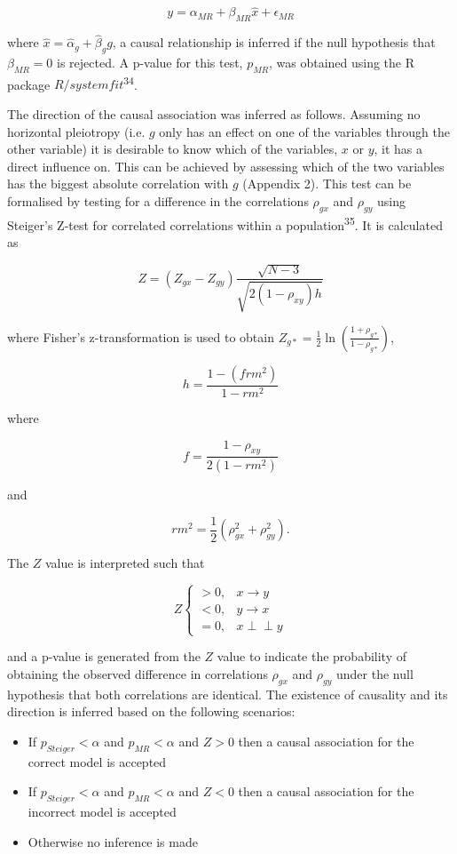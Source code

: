 \documentclass[]{article}
\providecommand{\tightlist}{%
  \setlength{\itemsep}{0pt}\setlength{\parskip}{0pt}}
\begin{document}
\[
y = \alpha_{MR} + \beta_{MR} \hat{x} + \epsilon_{MR}
\]

where \(\hat{x} = \hat{\alpha}_g + \hat{\beta}_g g\), a causal
relationship is inferred if the null hypothesis that \(\beta_{MR} = 0\)
is rejected. A p-value for this test, \(p_{MR}\), was obtained using the
R package \(R/systemfit\)\textsuperscript{34}.

The direction of the causal association was inferred as follows.
Assuming no horizontal pleiotropy (i.e. \(g\) only has an effect on one
of the variables through the other variable) it is desirable to know
which of the variables, \(x\) or \(y\), it has a direct influence on.
This can be achieved by assessing which of the two variables has the
biggest absolute correlation with \(g\) (Appendix 2). This test can be
formalised by testing for a difference in the correlations \(\rho_{gx}\)
and \(\rho_{gy}\) using Steiger's Z-test for correlated correlations
within a population\textsuperscript{35}. It is calculated as

\[
Z = (Z_{gx} - Z_{gy}) \frac{\sqrt{N-3}}{\sqrt{2(1-\rho_{xy})h}}
\]

where Fisher's z-transformation is used to obtain
\(Z_{g*} = \frac{1}{2} \ln \left ( \frac{1+\rho_{g*}}{1-\rho_{g*}} \right )\),

\[
h = \frac{1 - (frm^2)} {1 - rm^2}
\]

where

\[
f = \frac{1 - \rho_{xy}}{2(1 - rm^2)}
\]

and

\[
rm^2 = \frac{1}{2}(\rho_{gx}^2 + \rho_{gy}^2).
\]

The \(Z\) value is interpreted such that

\[
Z \left\{
\begin{array}{ll}
> 0, & x \to y\\
< 0, & y \to x\\
= 0, & x \perp\!\!\!\perp y 
\end{array} \right.
\]

and a p-value is generated from the \(Z\) value to indicate the
probability of obtaining the observed difference in correlations
\(\rho_{gx}\) and \(\rho_{gy}\) under the null hypothesis that both
correlations are identical. The existence of causality and its direction
is inferred based on the following scenarios:

\begin{itemize}
\tightlist
\item
  If \(p_{Steiger} < \alpha\) and \(p_{MR} < \alpha\) and \(Z > 0\) then
  a causal association for the correct model is accepted
\item
  If \(p_{Steiger} < \alpha\) and \(p_{MR} < \alpha\) and \(Z < 0\) then
  a causal association for the incorrect model is accepted
\item
  Otherwise no inference is made
\end{itemize}
\end{document}
